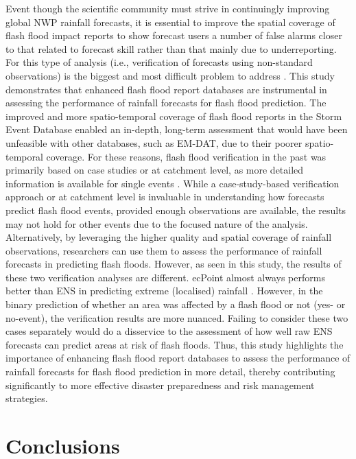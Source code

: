 Event  though the scientific community must strive in continuingly improving global NWP rainfall forecasts, it is essential to improve the spatial coverage of flash flood impact reports to show forecast users a number of false alarms closer to that related to forecast skill rather than that mainly due to underreporting. For this type of analysis (i.e., verification of forecasts using non-standard observations) is the biggest and most difficult problem to address \citep{Marsigli_2021}. This study demonstrates that enhanced flash flood report databases are instrumental in assessing the performance of rainfall forecasts for flash flood prediction. The improved and more spatio-temporal coverage of flash flood reports in the Storm Event Database enabled an in-depth, long-term assessment that would have been unfeasible with other databases, such as EM-DAT, due to their poorer spatio-temporal coverage. For these reasons, flash flood verification in the past was primarily based on case studies or at catchment level, as more detailed information is available for single events \citep{Gaume_2009, Gaume_2016}. While a case-study-based verification approach or at catchment level is invaluable in understanding how forecasts predict flash flood events, provided enough observations are available, the results may not hold for other events due to the focused nature of the analysis. Alternatively, by leveraging the higher quality and spatial coverage of rainfall observations, researchers can use them to assess the performance of rainfall forecasts in predicting flash floods. However, as seen in this study, the results of these two verification analyses are different. ecPoint almost always performs better than ENS in predicting extreme (localised) rainfall \citep{Gascón_2024, Hemri_2022, Hewson_2021}. However, in the binary prediction of whether an area was affected by a flash flood or not (yes- or no-event), the verification results are more nuanced. Failing to consider these two cases separately would do a disservice to the assessment of how well raw ENS forecasts can predict areas at risk of flash floods. Thus, this study highlights the importance of enhancing flash flood report databases to assess the performance of rainfall forecasts for flash flood prediction in more detail, thereby contributing significantly to more effective disaster preparedness and risk management strategies.


\section{Conclusions}
\label{flash_flood_focused_verification_rainfall_based_ff_CONCLUSIONS}


